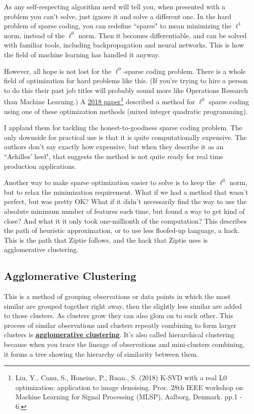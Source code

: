 As any self-respecting algorithm nerd will tell you, when presented
with a problem you can't solve, just ignore it and solve a different one.
In the hard problem of sparse coding, you can redefine ``sparse"
to mean minimizing the $\ell^1$ norm,
instead of the $\ell^0$ norm. Then it becomes differentiable, and can be
solved with familiar tools, including backpropagation and neural networks.
This is how the field of machine learning has handled it anyway.

However, all hope is not lost for the $\ell^0$-sparse coding problem.
There is a whole field of optimization
for hard problems like this. (If you're trying to hire a person to do this
their past job titles will probably sound more like
Operations Research than
Machine Learning.)
A \href{https://hal.science/hal-01965904/document}{2018 paper}\footnote{
Liu, Y., Canu, S., Honeine, P., Ruan., S. (2018)
K-SVD with a real L0 optimization: application
to image denoising.
Proc. 28th IEEE workshop on Machine Learning for Signal Processing (MLSP),
Aalborg, Denmark. pp.1 - 6.}
described a method for $\ell^0$ sparse coding using
one of these optimization methods (mixed integer quadratic programming).

I applaud them for tackling the honest-to-goodness sparse coding problem.
The only downside for practical use is that it is quite computationally
expensive. The authors don't say exactly how expensive, but when
they describe it as an ``Achilles' heel", that suggests the method is not quite
ready for real time production applications.

Another way to make sparse optimization easier to solve is to keep the
$\ell^0$ norm, but to relax the minimization requirement. What if we had
a method that wasn't perfect, but was pretty OK? What if it didn't necessarily
find the way to use the absolute minimum number of features each time,
but found a way to get kind of close? And what it it only took one-millionth
of the computation? This describes the path of heuristic approximation,
or to use less floofed-up language, a hack. This is the path that Ziptie
follows, and the hack that Ziptie uses is
agglomerative clustering.

\subsection{Agglomerative Clustering}
\label{subsec:agglomeration}

This is a method of grouping observations or data points in which
the most similar are grouped together right away, then the slightly less
similar are added to those clusters. As clusters grow they can also glom on
to each other. This process of similar observations and clusters
repeatly combining to form larger clusters is
\textbf{\href{
https://en.wikipedia.org/w/index.php?title=Hierarchical_clustering&section=3
}{agglomerative clustering}}.
It's also called hierarchical clustering because when you trace the lineage
of observations and mini-clusters combining, it forms a tree showing
the hierarchy of similarity between them. 

